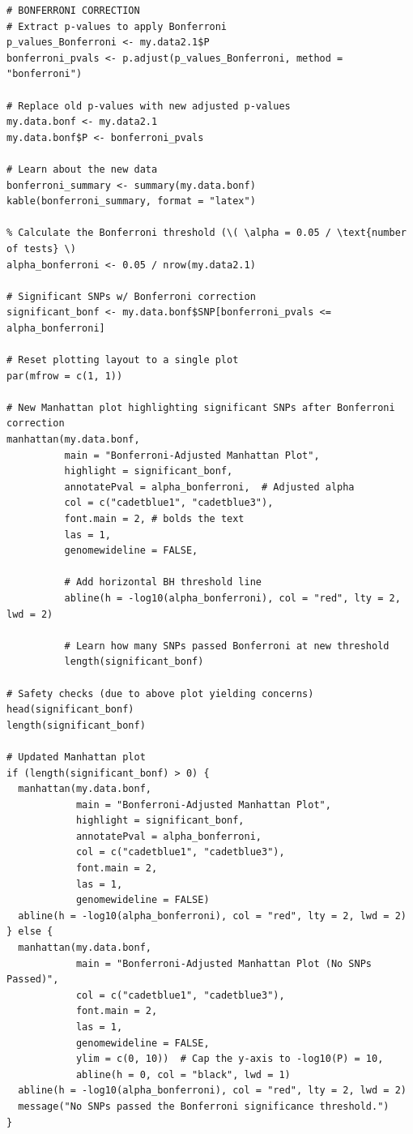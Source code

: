 \documentclass[12pt]{article}
\begin{document}
\begin{lstlisting}[style=Rstyle]
# BONFERRONI CORRECTION
# Extract p-values to apply Bonferroni
p_values_Bonferroni <- my.data2.1$P
bonferroni_pvals <- p.adjust(p_values_Bonferroni, method = "bonferroni")

# Replace old p-values with new adjusted p-values
my.data.bonf <- my.data2.1
my.data.bonf$P <- bonferroni_pvals

# Learn about the new data
bonferroni_summary <- summary(my.data.bonf)
kable(bonferroni_summary, format = "latex")

% Calculate the Bonferroni threshold (\( \alpha = 0.05 / \text{number of tests} \)
alpha_bonferroni <- 0.05 / nrow(my.data2.1)

# Significant SNPs w/ Bonferroni correction
significant_bonf <- my.data.bonf$SNP[bonferroni_pvals <= alpha_bonferroni]

# Reset plotting layout to a single plot
par(mfrow = c(1, 1))

# New Manhattan plot highlighting significant SNPs after Bonferroni correction
manhattan(my.data.bonf,
          main = "Bonferroni-Adjusted Manhattan Plot",
          highlight = significant_bonf,
          annotatePval = alpha_bonferroni,  # Adjusted alpha
          col = c("cadetblue1", "cadetblue3"),
          font.main = 2, # bolds the text
          las = 1,
          genomewideline = FALSE,

          # Add horizontal BH threshold line
          abline(h = -log10(alpha_bonferroni), col = "red", lty = 2, lwd = 2) 

          # Learn how many SNPs passed Bonferroni at new threshold
          length(significant_bonf)
          
# Safety checks (due to above plot yielding concerns)
head(significant_bonf)
length(significant_bonf)

# Updated Manhattan plot
if (length(significant_bonf) > 0) {
  manhattan(my.data.bonf,
            main = "Bonferroni-Adjusted Manhattan Plot",
            highlight = significant_bonf,
            annotatePval = alpha_bonferroni,
            col = c("cadetblue1", "cadetblue3"),
            font.main = 2,
            las = 1,
            genomewideline = FALSE)
  abline(h = -log10(alpha_bonferroni), col = "red", lty = 2, lwd = 2)
} else {
  manhattan(my.data.bonf,
            main = "Bonferroni-Adjusted Manhattan Plot (No SNPs Passed)",
            col = c("cadetblue1", "cadetblue3"),
            font.main = 2,
            las = 1,
            genomewideline = FALSE,
            ylim = c(0, 10))  # Cap the y-axis to -log10(P) = 10,
            abline(h = 0, col = "black", lwd = 1)
  abline(h = -log10(alpha_bonferroni), col = "red", lty = 2, lwd = 2)
  message("No SNPs passed the Bonferroni significance threshold.")
}
\end{lstlisting}
\clearpage
\end{document}
